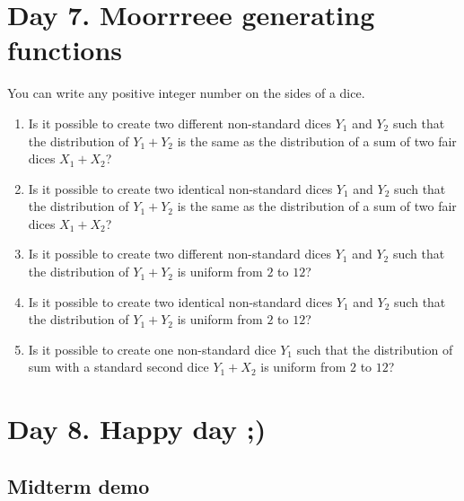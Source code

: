\documentclass[12pt]{article}
\begin{document}
\section{Day 7. Moorrreee generating functions}

\begin{exercise}
You can write any positive integer number on the sides of a dice. 
\begin{enumerate}[label=\alph*)]
    \item Is it possible to create two different non-standard dices $Y_1$ and $Y_2$ such that the distribution of $Y_1 + Y_2$ is the same as the distribution of a sum of two fair dices $X_1 + X_2$?  
    \item Is it possible to create two identical non-standard dices $Y_1$ and $Y_2$ such that the distribution of $Y_1 + Y_2$ is the same as the distribution of a sum of two fair dices $X_1 + X_2$?
    \item Is it possible to create two different non-standard dices $Y_1$ and $Y_2$ such that the distribution of $Y_1 + Y_2$ is uniform from $2$ to $12$?
    \item Is it possible to create two identical non-standard dices $Y_1$ and $Y_2$ such that the distribution of $Y_1 + Y_2$ is uniform from $2$ to $12$?
    \item Is it possible to create one non-standard dice $Y_1$ such that the distribution of sum with a standard second dice $Y_1 + X_2$ is uniform from $2$ to $12$?
\end{enumerate}    
\end{exercise}


\begin{exercise}


\end{exercise}

\section{Day 8. Happy day ;)}

\subsection*{Midterm demo}
\end{document}
